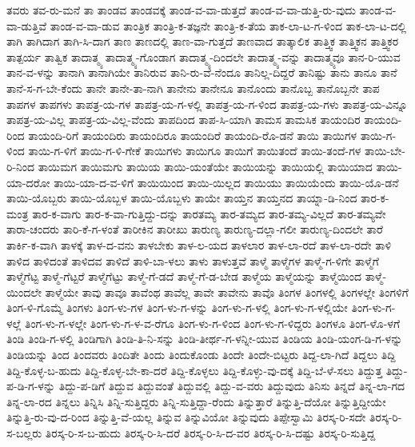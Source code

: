 {ತವರು
ತವ-ರು-ಮನೆ
ತಾ
ತಾಂಡವ
ತಾಂಡವಕ್ಕೆ
ತಾಂಡ-ವ-ವಾ-ಡುತ್ತದೆ
ತಾಂಡ-ವ-ವಾ-ಡುತ್ತಿ-ರು-ವುದು
ತಾಂಡ-ವ-ವಾ-ಡುತ್ತಿವೆ
ತಾಂಡ-ವ-ವಾ-ಡುವ
ತಾಂತ್ರಿಕ
ತಾಂತ್ರಿ-ಕ-ತಜ್ಞನೇ
ತಾಂತ್ರಿ-ಕ-ತೆಯ
ತಾಕ-ಲಾ-ಟ-ಗ-ಳಿಂದ
ತಾಕ-ಲಾ-ಟ-ದಲ್ಲಿ
ತಾಗಿ
ತಾಗಿದಾಗ
ತಾಗಿ-ಸಿ-ದಾಗ
ತಾಣ
ತಾಣದಲ್ಲಿ
ತಾಣ-ವಾ-ಗುತ್ತದೆ
ತಾಣವಾದ
ತಾತ್ಕಾಲಿಕ
ತಾತ್ತ್ವಿಕ
ತಾತ್ತ್ವಿಕನ
ತಾತ್ತ್ವಿಕರ
ತಾತ್ಪರ್ಯ
ತಾತ್ವಿಕ
ತಾದಾತ್ಮ್ಯ
ತಾದಾತ್ಮ್ಯ-ಗೊಂಡಾಗ
ತಾದಾತ್ಮ್ಯ-ದಿಂದಲೇ
ತಾದಾತ್ಮ್ಯ-ವನ್ನು
ತಾದಾತ್ಮ್ಯವೂ
ತಾನ-ರಿ-ಯುವ
ತಾನ-ವ-ಳನ್ನು
ತಾನಾಗಿ
ತಾನಾಗಿಯೇ
ತಾನಿರುವ
ತಾನಿ-ರು-ವೆ-ನೆಂದೂ
ತಾನಿಲ್ಲ-ದಿದ್ದರೆ
ತಾನಿಷ್ಟು
ತಾನು
ತಾನೂ
ತಾನೆ
ತಾನೆ-ಸ-ಗ-ಬೇ-ಕೆಂದು
ತಾನೇ
ತಾನೇ-ತಾ-ನಾಗಿ
ತಾನೇನು
ತಾನೇನೂ
ತಾನೊಂದು
ತಾನೊಬ್ಬ
ತಾನೊಬ್ಬನೇ
ತಾಪ
ತಾಪಗಳ
ತಾಪಗಳು
ತಾಪತ್ರ-ಯ-ಗಳ
ತಾಪತ್ರ-ಯ-ಗ-ಳಲ್ಲಿ
ತಾಪತ್ರ-ಯ-ಗ-ಳಿಂದ
ತಾಪತ್ರ-ಯ-ಗಳು
ತಾಪತ್ರ-ಯ-ವಿನ್ನೂ
ತಾಪತ್ರ-ಯ-ವಿಲ್ಲ
ತಾಪತ್ರ-ಯ-ವಿಲ್ಲ-ವೆಂದು
ತಾಪದಿಂದ
ತಾಪ-ಸಿ-ಯಾಗಿ
ತಾಮಸ
ತಾಮಸಿಕ
ತಾಯಂದಿರ
ತಾಯಂದಿ-ರಿಂದ
ತಾಯಂದಿ-ರಿಗೆ
ತಾಯಂದಿರು
ತಾಯಂದಿರೂ
ತಾಯಂದಿರೆ
ತಾಯಂದಿ-ರೊ-ಡನೆ
ತಾಯಿ
ತಾಯಿಗಳ
ತಾಯಿ-ಗ-ಳಿಂದ
ತಾಯಿ-ಗ-ಳಿಗೆ
ತಾಯಿ-ಗ-ಳಿ-ಗೇಕೆ
ತಾಯಿಗಳು
ತಾಯಿಗೂ
ತಾಯಿಗೆ
ತಾಯಿತಂದೆ
ತಾಯಿ-ತಂದೆ-ಗಳ
ತಾಯಿ-ಬೇ-ರಿ-ನಿಂದ
ತಾಯಿಮಗ
ತಾಯಿಮಗು
ತಾಯಿಯ
ತಾಯಿ-ಯಂತೆಯೇ
ತಾಯಿಯನ್ನು
ತಾಯಿಯಲ್ಲಿ
ತಾಯಿಯಾದ
ತಾಯಿ-ಯಾ-ದರೋ
ತಾಯಿ-ಯಾ-ದ-ವ-ಳಿಗೆ
ತಾಯಿಯಿಂದ
ತಾಯಿ-ಯಿಲ್ಲದ
ತಾಯಿಯು
ತಾಯಿಯೆಂದು
ತಾಯಿ-ಯೊ-ಡನೆ
ತಾಯಿ-ಯೊಬ್ಬರು
ತಾಯಿ-ಯೊಬ್ಬಳ
ತಾಯಿ-ಯೊಬ್ಬಳು
ತಾಯೇ
ತಾಯ್ತನ
ತಾಯ್ತನದ
ತಾಯ್ನಾ-ಡಿ-ನಿಂದ
ತಾರ-ಕ-ಮಂತ್ರ
ತಾರ-ಕ-ವಾಗು
ತಾರ-ಕ-ವಾ-ಗುತ್ತಿದ್ದು-ದನ್ನು
ತಾರತಮ್ಯ
ತಾರ-ತಮ್ಯದ
ತಾರ-ತಮ್ಯ-ವಿಲ್ಲದೆ
ತಾರ-ತಮ್ಯವೇ
ತಾರಾ-ಚಂದರು
ತಾರಿ-ಕೆ-ಗ-ಳಂತೆ
ತಾರೀಕಿನ
ತಾರೀಖು
ತಾರುಣ್ಯ
ತಾರುಣ್ಯ-ದಲ್ಲಾ-ಗಲೀ
ತಾರುಣ್ಯ-ದಿಂದಲೇ
ತಾರೆ
ತಾರ್ಕಿ-ಕ-ವಾಗಿ
ತಾಳಕ್ಕೆ
ತಾಳ-ದ-ವನು
ತಾಳಬೇಕು
ತಾಳ-ಲ-ಯದ
ತಾಳಲಾರ
ತಾಳ-ಲಾ-ರದೆ
ತಾಳ-ಲಾ-ರದೇ
ತಾಳಿ
ತಾಳಿದ
ತಾಳಿದಂತೆ
ತಾಳಿದವ
ತಾಳಿದೆ
ತಾಳಿ-ಬಾ-ಳಲು
ತಾಳು
ತಾಳುತ್ತವೆ
ತಾಳ್ಮೆ
ತಾಳ್ಮೆಗಳ
ತಾಳ್ಮೆ-ಗ-ಳಿಗೇ
ತಾಳ್ಮೆಗೆ
ತಾಳ್ಮೆಗೆಟ್ಟ
ತಾಳ್ಮೆ-ಗೆಟ್ಟರೆ
ತಾಳ್ಮೆಗೆಟ್ಟು
ತಾಳ್ಮೆ-ಗೆ-ಡದೆ
ತಾಳ್ಮೆ-ಗೆ-ಡ-ಬೇಡ
ತಾಳ್ಮೆಯ
ತಾಳ್ಮೆಯನ್ನು
ತಾಳ್ಮೆಯಿಂದ
ತಾಳ್ಮೆ-ಯಿಂದಲೇ
ತಾಳ್ಮೆಯೇ
ತಾವು
ತಾವೂ
ತಾವೆಂಥ
ತಾವೆಲ್ಲ
ತಾವೇ
ತಾವೇನು
ತಾವೊ
ತಿಂಗಳ
ತಿಂಗಳಲ್ಲಿ
ತಿಂಗಳಲ್ಲೇ
ತಿಂಗಳಿಗೆ
ತಿಂಗ-ಳಿ-ಗೊಮ್ಮೆ
ತಿಂಗಳು
ತಿಂಗ-ಳು-ಗಳ
ತಿಂಗ-ಳು-ಗ-ಳನ್ನು
ತಿಂಗ-ಳು-ಗ-ಳಲ್ಲಿ
ತಿಂಗ-ಳು-ಗ-ಳಲ್ಲಿಯೇ
ತಿಂಗ-ಳು-ಗ-ಳಲ್ಲೆ
ತಿಂಗ-ಳು-ಗ-ಳಲ್ಲೇ
ತಿಂಗ-ಳು-ಗ-ಳ-ವ-ರೆಗೂ
ತಿಂಗ-ಳು-ಗ-ಳಿಂದ
ತಿಂಗ-ಳು-ಗ-ಳಿದ್ದರು
ತಿಂಗಳೂ
ತಿಂಗ-ಳೊ-ಳಗೆ
ತಿಂಡಿ
ತಿಂಡಿ-ಗ-ಳಲ್ಲಿ
ತಿಂಡಿಗಾಗಿ
ತಿಂಡಿ-ತಿ-ನಿ-ಸನ್ನು
ತಿಂಡಿ-ತೀರ್ಥ-ಗ-ಳನ್ನೀ-ಯುವ
ತಿಂಡಿಯ
ತಿಂಡಿ-ಯಂಗ-ಡಿ-ಗ-ಳನ್ನು
ತಿಂಡಿಯನ್ನು
ತಿಂದ
ತಿಂದವರು
ತಿಂದಿತೇ
ತಿಂದು
ತಿಂದುಕೊಂಡು
ತಿಂದೇ
ತಿಂದೇ-ಬಿಟ್ಟರು
ತಿದ್ದ-ಲಾ-ಗಿದೆ
ತಿದ್ದಲು
ತಿದ್ದಿ
ತಿದ್ದಿ-ಕೊಳ್ಳ-ಬ-ಹುದು
ತಿದ್ದಿ-ಕೊಳ್ಳ-ಬೇ-ಕಾ-ದರೆ
ತಿದ್ದಿ-ಕೊಳ್ಳಲು
ತಿದ್ದಿ-ಕೊಳ್ಳು-ವು-ದಕ್ಕೆ
ತಿದ್ದಿ-ಬೆ-ಳೆ-ಸಲು
ತಿದ್ದುತ್ತ
ತಿದ್ದು-ಪ-ಡಿ-ಗ-ಳನ್ನು
ತಿದ್ದು-ಪ-ಡಿಗೆ
ತಿದ್ದುವ
ತಿದ್ದುವಂತೆ
ತಿದ್ದುವಲ್ಲಿ
ತಿದ್ದು-ವ-ವರು
ತಿದ್ದುವುದು
ತಿನಿಸು
ತಿನ್ನದೆ
ತಿನ್ನ-ಲಾ-ಗದ
ತಿನ್ನ-ಲಾ-ರದ
ತಿನ್ನಲು
ತಿನ್ನಿಸಿ
ತಿನ್ನಿ-ಸುತ್ತಿದ್ದರು
ತಿನ್ನಿ-ಸುತ್ತಿದ್ದಾ-ರೆಂದು
ತಿನ್ನುತ್ತಾರೆ
ತಿನ್ನುತ್ತಿ-ದೆಯೋ
ತಿನ್ನುತ್ತಿದ್ದೀಯೇ
ತಿನ್ನುತ್ತಿ-ರು-ವು-ದ-ರಿಂದ
ತಿನ್ನುತ್ತಿ-ವೆ-ಯಲ್ಲ
ತಿನ್ನುವ
ತಿನ್ನುವಿಯೋ
ತಿನ್ನುವುದು
ತಿಪ್ಪೇಸ್ವಾಮಿ
ತಿರಸ್ಕ-ರಿ-ಸದೇ
ತಿರಸ್ಕ-ರಿ-ಸ-ಬಲ್ಲರು
ತಿರಸ್ಕ-ರಿ-ಸ-ಬ-ಹುದು
ತಿರಸ್ಕ-ರಿ-ಸಿ-ದರೆ
ತಿರಸ್ಕ-ರಿ-ಸಿ-ದ-ವರ
ತಿರಸ್ಕ-ರಿ-ಸಿ-ದಷ್ಟು
ತಿರಸ್ಕ-ರಿ-ಸುತ್ತಿದ್ದ
}
